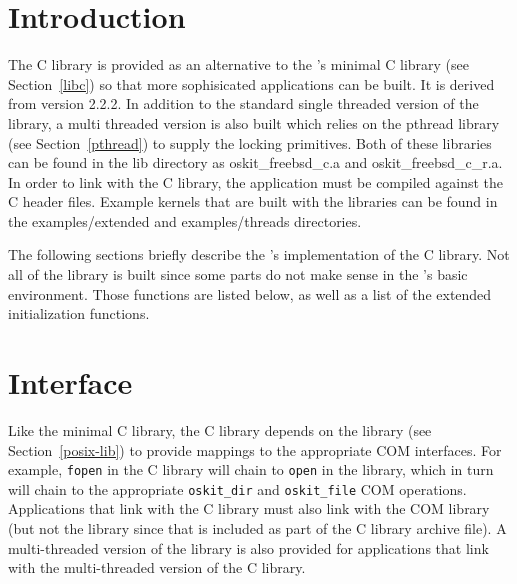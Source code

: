 %
% 
%
\label{freebsd-libc}

\section{Introduction}

The \freebsd{} C library is provided as an alternative to the \oskit's
minimal C library (see Section~\ref{libc}) so that more sophisicated
applications can be built. It is derived from version 2.2.2. In addition to
the standard single threaded version of the library, a multi threaded
version is also built which relies on the pthread library (see
Section~\ref{pthread}) to supply the locking primitives.
Both of these libraries
can be found in the lib directory as oskit_freebsd_c.a and
oskit_freebsd_c_r.a. In order to link with the \freebsd{} C library, the
application must be compiled against the \freebsd{} C header files. Example
kernels that are built with the \freebsd{} libraries can be found in the
examples/extended and examples/threads directories.

The following sections briefly describe the \oskit's implementation of the
\freebsd{} C library. Not all of the library is built since some parts do not
make sense in the \oskit's basic environment. Those functions are listed
below, as well as a list of the extended initialization functions.

\section{\textnormal{\posix{}} Interface}

Like the minimal C library, the \freebsd{} C library depends on the
\posix{} library (see Section~\ref{posix-lib}) to provide mappings to the
appropriate \oskit{} COM interfaces. For example, \texttt{fopen} in the C
library will chain to \texttt{open} in the \posix{} library, which in turn
will chain to the appropriate {\tt oskit_dir} and {\tt oskit_file} COM
operations. Applications that link with the \freebsd{} C library must also
link with the COM library (but not the \posix{} library since that is
included as part of the \freebsd{} C library archive file). A
multi-threaded version of the \posix{} library is also provided for
applications that link with the multi-threaded version of the \freebsd{} C
library.

